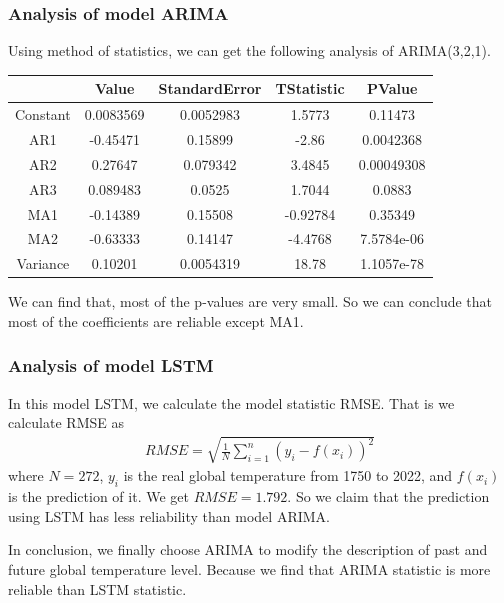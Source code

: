 \documentclass{apmcmthesis}
\begin{document}
  \subsubsection{Analysis of model ARIMA}
  
  Using method of statistics, we can get the following analysis of ARIMA(3,2,1).
  
  \begin{center}
  \begin{tabular}{c|cccc}
    \hline
     &Value& StandardError& TStatistic &PValue\\
    \hline
    Constant  &  0.0083569    &  0.0052983    &     1.5773    &    0.11473\\
      AR{1}    &    -0.45471   &     0.15899  &        -2.86  &    0.0042368\\
      AR{2}    &    0.27647    &   0.079342   &      3.4845   &  0.00049308\\
      AR{3}    &  0.089483     &    0.0525    &     1.7044    &     0.0883\\
      MA{1}   &     -0.14389   &     0.15508  &     -0.92784  &      0.35349\\
      MA{2}    &    -0.63333   &     0.14147  &      -4.4768  &   7.5784e-06\\
      Variance  &    0.10201   &   0.0054319  &        18.78  &   1.1057e-78\\
    \hline
    \end{tabular}
  \end{center}
  
  We can find that, most of the p-values are very small.
  So we can conclude that most of the coefficients are reliable except MA{1}.
  
  \subsubsection{Analysis of model LSTM}
  In this model LSTM, we calculate the model statistic RMSE.
  That is we calculate RMSE as 
  \begin{align*}
    RMSE=\sqrt{\frac{1}{N} \sum_{i=1}^n (y_i - f(x_i))^2} 
  \end{align*}
  where $N=272$, $y_i$ is the real global temperature from 1750 to 2022, and $f(x_i)$ is the prediction of it.
  We get $RMSE = 1.792$. 
  So we claim that the prediction using LSTM has less reliability than model ARIMA.
  
  In conclusion, we finally choose ARIMA to modify the description of past and future global temperature level.
  Because we find that ARIMA statistic is more reliable than LSTM statistic.
  
\end{document}
